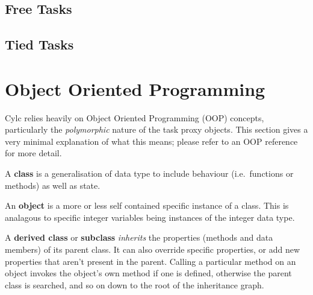 \documentclass[11pt,a4paper]{article}
\begin{document}


\lstset{language=bash}

\pagebreak
\subsection{Free Tasks}


\pagebreak
\subsection{Tied Tasks}


\appendix

\pagebreak
\section{Object Oriented Programming}
\label{ObjectOrientedProgramming}

Cylc relies heavily on Object Oriented Programming (OOP) concepts,
particularly the {\em polymorphic} nature of the task proxy objects.
This section gives a very minimal explanation of what this means;
please refer to an OOP reference for more detail.

A {\bf class} is a generalisation of data type to include behaviour
(i.e.\ functions or methods) as well as state. 


An {\bf object} is a more or less self contained specific instance
of a class. This is analagous to specific integer variables being 
instances of the integer data type.

A {\bf derived class} or {\bf subclass} {\em inherits} the properties
(methods and data members) of its parent class. It can also override
specific properties, or add new properties that aren't present in the
parent. Calling a particular method on an object invokes the object's
own method if one is defined, otherwise the parent class is searched,
and so on down to the root of the inheritance graph. 

\end{document}
